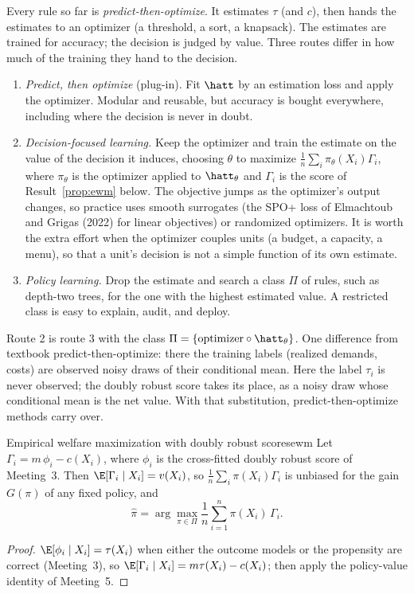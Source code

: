 \documentclass[11pt]{article}
\begin{document}
Every rule so far is \emph{predict-then-optimize}. It estimates $\tau$ (and $c$), then hands the estimates to an
optimizer (a threshold, a sort, a knapsack). The estimates are trained for accuracy; the decision is judged by value. Three routes
differ in how much of the training they hand to the decision.
\begin{enumerate}
  \item \emph{Predict, then optimize} (plug-in). Fit $\hatt$ by an estimation loss and apply the optimizer. Modular and
  reusable, but accuracy is bought everywhere, including where the decision is never in doubt.
  \item \emph{Decision-focused learning.} Keep the optimizer and train the estimate on the value of the decision it
  induces, choosing $\theta$ to maximize $\frac1n\sum_i \pi_\theta(X_i)\Gamma_i$, where $\pi_\theta$ is the optimizer applied to
  $\hatt_\theta$ and $\Gamma_i$ is the score of Result~\ref{prop:ewm} below. The objective jumps as the optimizer's output
  changes, so practice uses smooth surrogates (the SPO+ loss of Elmachtoub and Grigas (2022) for linear objectives) or
  randomized optimizers. It is worth the extra effort when the optimizer couples units (a budget, a capacity, a menu), so that
  a unit's decision is not a simple function of its own estimate.
  \item \emph{Policy learning.} Drop the estimate and search a class $\Pi$ of rules, such as depth-two trees, for the one with
  the highest estimated value. A restricted class is easy to explain, audit, and deploy.
\end{enumerate}
Route 2 is route 3 with the class $\Pi = \{\text{optimizer} \circ \hatt_\theta\}$. One difference from textbook
predict-then-optimize: there the training labels (realized demands, costs) are observed noisy draws of their conditional
mean. Here the label $\tau_i$ is never observed; the doubly robust score takes its place, as a noisy draw whose
conditional mean is the net value. With that substitution, predict-then-optimize methods carry over.

\begin{prop}{Empirical welfare maximization with doubly robust scores}{ewm}
Let $\Gamma_i = m\,\phi_i - c(X_i)$, where $\phi_i$ is the cross-fitted doubly robust score of Meeting~3. Then
$\E[\Gamma_i \mid X_i] = v(X_i)$, so $\frac1n\sum_i \pi(X_i)\Gamma_i$ is unbiased for the gain $G(\pi)$ of any fixed policy, and
\[
  \hat\pi = \arg\max_{\pi \in \Pi} \frac1n\sum_{i=1}^n \pi(X_i)\,\Gamma_i .
\]
\end{prop}
\begin{proof}
$\E[\phi_i \mid X_i] = \tau(X_i)$ when either the outcome models or the propensity are correct (Meeting~3), so
$\E[\Gamma_i \mid X_i] = m\tau(X_i) - c(X_i)$; then apply the policy-value identity of Meeting~5.
\end{proof}
\end{document}
